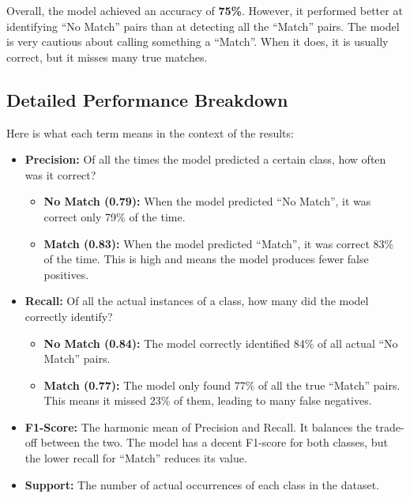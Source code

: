 Overall, the model achieved an accuracy of \textbf{75\%}. However, it performed
better at identifying ``No Match'' pairs than at detecting all the ``Match''
pairs. The model is very cautious about calling something a ``Match''. When it
does, it is usually correct, but it misses many true matches.

\subsection{Detailed Performance Breakdown}

Here is what each term means in the context of the results:

\begin{itemize}
    \item \textbf{Precision:} Of all the times the model predicted a certain class, how often was it correct?
          \begin{itemize}
              \item \textbf{No Match (0.79):} When the model predicted ``No Match'', it was correct only 79\% of the time.
              \item \textbf{Match (0.83):} When the model predicted ``Match'', it was correct 83\% of the time. This is high and means the model produces fewer false positives.
          \end{itemize}

    \item \textbf{Recall:} Of all the actual instances of a class, how many did the model correctly identify?
          \begin{itemize}
              \item \textbf{No Match (0.84):} The model correctly identified 84\% of all actual ``No Match'' pairs.
              \item \textbf{Match (0.77):} The model only found 77\% of all the true ``Match'' pairs. This means it missed 23\% of them, leading to many false negatives.
          \end{itemize}

    \item \textbf{F1-Score:} The harmonic mean of Precision and Recall. It balances the trade-off between the two. The model has a decent F1-score for both classes, but the lower recall for ``Match'' reduces its value.

    \item \textbf{Support:} The number of actual occurrences of each class in the dataset.
\end{itemize}

